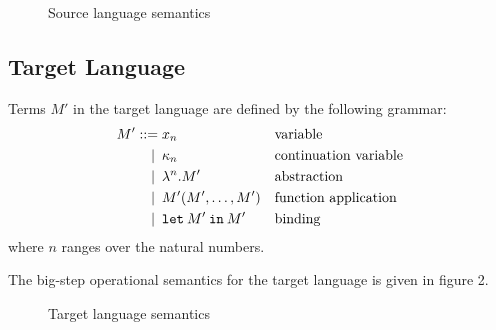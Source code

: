 \documentclass[a4paper,11pt]{article}
\begin{document}
\begin{figure}
\caption{Source language semantics}
\end{figure}

\subsection{Target Language}

Terms $M'$ in the target language are defined by the following grammar:
\begin{align*}
M' ::=            &\; x_{n}
                  && \text{variable} \\
\llap{\textbar\:} &\; \kappa_{n}
                  && \text{continuation variable} \\
\llap{\textbar\:} &\; \lambda^{n}.M'
                  && \text{abstraction} \\
\llap{\textbar\:} &\; M'(M', \ldots, M')
                  && \text{function application} \\
\llap{\textbar\:} &\; \texttt{let} \: M' \: \texttt{in} \: M'
                  && \text{binding}
\end{align*}
where $n$ ranges over the natural numbers.

The big-step operational semantics for the target language is given in figure 2.

\begin{figure}
\caption{Target language semantics}
\end{figure}
\end{document}

